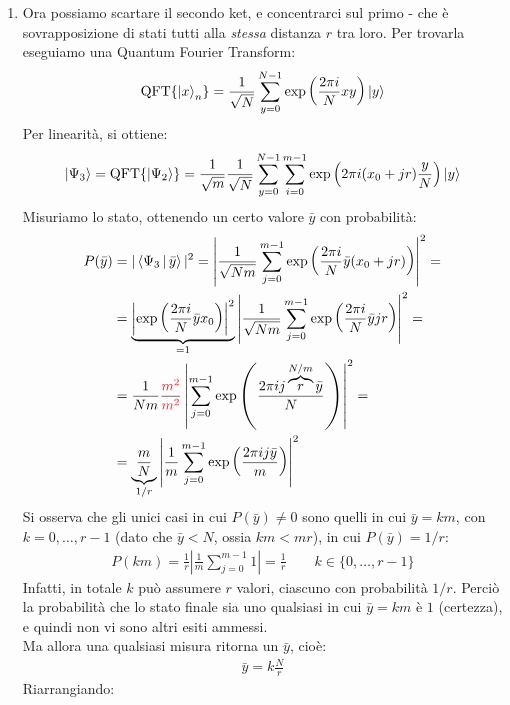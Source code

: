\documentclass[../../InformazioneQuantistica.tex]{subfiles}
\begin{document}
\begin{enumerate}
\item Ora possiamo scartare il secondo ket, e concentrarci sul primo - che è sovrapposizione di stati tutti alla \textit{stessa} distanza $r$ tra loro. Per trovarla eseguiamo una Quantum Fourier Transform:
\begin{align*}
    \operatorname{QFT}\{\Ket{x}_n\} = \frac{1}{\sqrt{N}} \sum_{y=0}^{N-1} \exp\left( \frac{2\pi i}{N} xy\right) \Ket{y}
\end{align*}
Per linearità, si ottiene:
\begin{align*}
\Ket{\Psi_3} = \operatorname{QFT}\{\Ket{\Psi_2}\} = \frac{1}{\sqrt{m}}\frac{1}{\sqrt{N}} \sum_{y=0}^{N-1}\sum_{i=0}^{m-1} \exp\left({2\pi i (x_0 + jr)\frac{y}{N}}\right) \Ket{y}
\end{align*}
Misuriamo lo stato, ottenendo un certo valore $\bar{y}$ con probabilità:
\begin{align*}
P(\bar{y}) &= |\braket{\Psi_3|\bar{y}} |^2 = \left| \frac{1}{\sqrt{Nm}} \sum_{j=0}^{m-1} \exp\left( \frac{2\pi i}{N} \bar{y}(x_0 + jr)\right) \right|^2 =\\
&= \underbrace{\left|\exp\left(\frac{2\pi i}{N} \bar{y} x_0 \right)\right|^2}_{=1} \left| \frac{1}{\sqrt{Nm}} \sum_{j=0}^{m-1} \exp\left( \frac{2\pi i}{N}\bar{y}jr \right) \right|^2 =\\
&= \frac{1}{Nm} \frac{\textcolor{Red}{m^2}}{\textcolor{Red}{m^2}} \left| \sum_{j=0}^{m-1} \exp\left(\frac{2\pi i j\overbrace{ r}^{N/m} \bar{y}}{N}\right)  \right|^2 = \\
 &= \underbrace{\frac{m}{N}}_{1/r} \left| \frac{1}{m} \sum_{j=0}^{m-1} \exp\left(\frac{2\pi ij \bar{y}}{m} \right) \right|^2 
\end{align*}
Si osserva che gli unici casi in cui $P(\bar{y})\neq 0$ sono quelli in cui $\bar{y}=km$, con $k=0,\dots, r-1$ (dato che $\bar{y} < N$, ossia $km < mr$), in cui $P(\bar{y}) = 1/r$:
\begin{align*}
P(km) = \frac{1}{r}\left|\frac{1}{m}\sum_{j=0}^{m-1} 1 \right| = \frac{1}{r} \qquad k \in \{0,\dots,r-1\}
\end{align*} 
Infatti, in totale $k$ può assumere $r$ valori, ciascuno con probabilità $1/r$. Perciò la probabilità che lo stato finale sia uno qualsiasi in cui $\bar{y} = km$ è $1$ (certezza), e quindi non vi sono altri esiti ammessi.\\
Ma allora una qualsiasi misura ritorna un $\bar{y}$, cioè:
\begin{align*}
\bar{y} = k \frac{N}{r}
\end{align*}
Riarrangiando:
\begin{align*}

\end{align*}
\end{enumerate}
\end{document}
